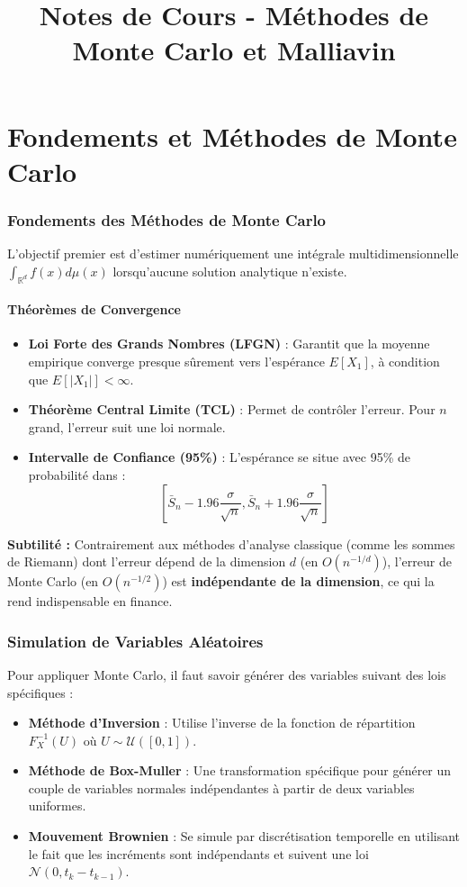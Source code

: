 \documentclass{article}
\title{Notes de Cours - Méthodes de Monte Carlo et Malliavin}
\date{}
\begin{document}
\maketitle

\part{Fondements et Méthodes de Monte Carlo}

\section{Fondements des Méthodes de Monte Carlo}
L'objectif premier est d'estimer numériquement une intégrale multidimensionnelle $\int_{\mathbb{R}^d} f(x)d\mu(x)$ lorsqu'aucune solution analytique n'existe.

\subsection{Théorèmes de Convergence}
\begin{itemize}
    \item \textbf{Loi Forte des Grands Nombres (LFGN)} : Garantit que la moyenne empirique converge presque sûrement vers l'espérance $E[X_1]$, à condition que $E[|X_1|] < \infty$.
    \item \textbf{Théorème Central Limite (TCL)} : Permet de contrôler l'erreur. Pour $n$ grand, l'erreur suit une loi normale.
    \item \textbf{Intervalle de Confiance (95\%)} : L'espérance se situe avec 95\% de probabilité dans :
    \[
    \left[ \bar{S}_n - 1.96 \frac{\sigma}{\sqrt{n}}, \bar{S}_n + 1.96 \frac{\sigma}{\sqrt{n}} \right]
    \]
\end{itemize}

\textbf{Subtilité :} Contrairement aux méthodes d'analyse classique (comme les sommes de Riemann) dont l'erreur dépend de la dimension $d$ (en $O(n^{-1/d})$), l'erreur de Monte Carlo (en $O(n^{-1/2})$) est \textbf{indépendante de la dimension}, ce qui la rend indispensable en finance.

\section{Simulation de Variables Aléatoires}
Pour appliquer Monte Carlo, il faut savoir générer des variables suivant des lois spécifiques :

\begin{itemize}
    \item \textbf{Méthode d'Inversion} : Utilise l'inverse de la fonction de répartition $F_X^{-1}(U)$ où $U \sim \mathcal{U}([0,1])$.
    \item \textbf{Méthode de Box-Muller} : Une transformation spécifique pour générer un couple de variables normales indépendantes à partir de deux variables uniformes.
    \item \textbf{Mouvement Brownien} : Se simule par discrétisation temporelle en utilisant le fait que les incréments sont indépendants et suivent une loi $\mathcal{N}(0, t_k - t_{k-1})$.
\end{itemize}
\end{document}
